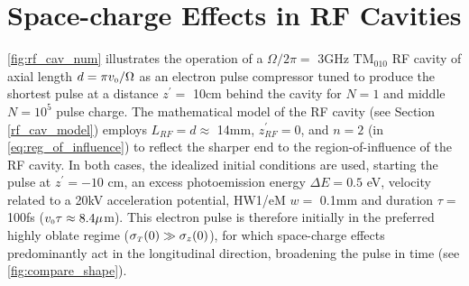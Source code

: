 
\section{Space-charge Effects in RF Cavities} \label{sec:rf_cav_charge}



\ref{fig:rf_cav_num} illustrates the operation of a $ \Omega / 2 \pi = $ 3GHz $\text{TM}_{010}$ RF cavity of axial length $ d = \pi v_{{\scriptscriptstyle 0}} / \Omega $ as an electron pulse compressor tuned to produce the shortest pulse at a distance $ z^{\prime} = $ 10cm behind the cavity for $N=1$ and middle $N=10^5$ pulse charge.
The mathematical model of the RF cavity (see Section \ref{rf_cav_model}) employs $L_{RF} = d \approx $ 14mm, $ z^{\prime}_{RF} = 0 $, and $n=2$ (in \ref{eq:reg_of_influence}) to reflect the sharper end to the region-of-influence of the RF cavity.
In both cases, the idealized initial conditions are used, starting the pulse at $ z^{\prime} = -10$ cm, an excess photoemission energy $\Delta E = 0.5$ eV, velocity related to a 20kV acceleration potential, HW1/eM $ w = $ 0.1mm and duration $\tau = $ 100fs ($v_{{\scriptscriptstyle 0}} \tau \approx 8.4 \mu$m).
This electron pulse is therefore initially in the preferred highly oblate regime ($ \sigma_{{\scriptscriptstyle T}}(0) \gg \sigma_{z} (0) $), for which space-charge effects predominantly act in the longitudinal direction, broadening the pulse in time (see \ref{fig:compare_shape}).


